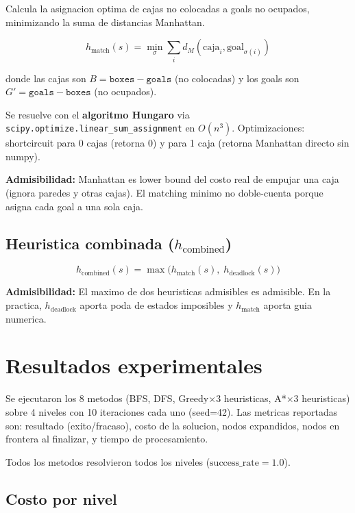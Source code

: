 \documentclass[12pt, a4paper]{article}
\begin{document}
Calcula la asignacion optima de cajas no colocadas a goals no ocupados, minimizando la suma de distancias Manhattan.

$$h_{\text{match}}(s) = \min_{\sigma} \sum_{i} d_M(\text{caja}_i, \text{goal}_{\sigma(i)})$$

donde las cajas son $B = \texttt{boxes} - \texttt{goals}$ (no colocadas) y los goals son $G' = \texttt{goals} - \texttt{boxes}$ (no ocupados).

Se resuelve con el \textbf{algoritmo Hungaro} via \texttt{scipy.optimize.linear\_sum\_assignment} en $O(n^3)$. Optimizaciones: shortcircuit para 0 cajas (retorna 0) y para 1 caja (retorna Manhattan directo sin numpy).

\textbf{Admisibilidad:} Manhattan es lower bound del costo real de empujar una caja (ignora paredes y otras cajas). El matching minimo no doble-cuenta porque asigna cada goal a una sola caja.

\subsection{Heuristica combinada ($h_{\text{combined}}$)}

$$h_{\text{combined}}(s) = \max\big(h_{\text{match}}(s),\; h_{\text{deadlock}}(s)\big)$$

\textbf{Admisibilidad:} El maximo de dos heuristicas admisibles es admisible. En la practica, $h_{\text{deadlock}}$ aporta poda de estados imposibles y $h_{\text{match}}$ aporta guia numerica.

\section{Resultados experimentales}

Se ejecutaron los 8 metodos (BFS, DFS, Greedy$\times$3 heuristicas, A*$\times$3 heuristicas) sobre 4 niveles con 10 iteraciones cada uno (seed=42). Las metricas reportadas son: resultado (exito/fracaso), costo de la solucion, nodos expandidos, nodos en frontera al finalizar, y tiempo de procesamiento.

Todos los metodos resolvieron todos los niveles ($\text{success\_rate} = 1.0$).

\subsection{Costo por nivel}
\end{document}
